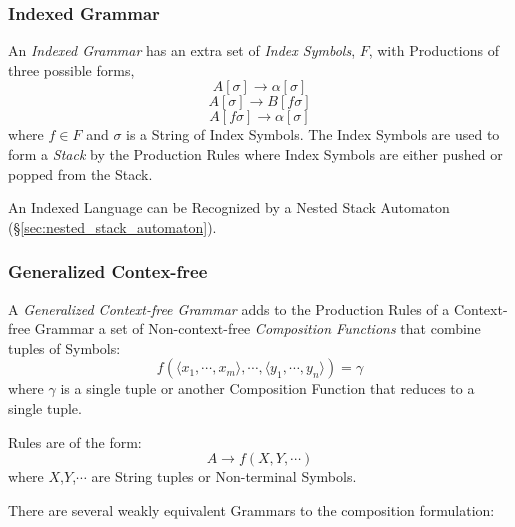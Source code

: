 \subsubsection{Indexed Grammar}\label{subsubsection:indexed_grammar}

An \emph{Indexed Grammar} has an extra set of \emph{Index Symbols},
$F$, with Productions of three possible forms,
\[
  A[\sigma] \rightarrow \alpha[\sigma]
\]\[
  A[\sigma] \rightarrow B[f\sigma]
\]\[
  A[f\sigma] \rightarrow \alpha[\sigma]
\]
where $f \in F$ and $\sigma$ is a String of Index Symbols. The Index
Symbols are used to form a \emph{Stack} by the Production Rules where
Index Symbols are either pushed or popped from the Stack.

An Indexed Language can be Recognized by a Nested Stack Automaton
(\S\ref{sec:nested_stack_automaton}).\cite{aho69}



\subsubsection{Generalized Contex-free}\label{sec:generalized_context_free}

A \emph{Generalized Context-free Grammar} adds to the Production Rules
of a Context-free Grammar a set of Non-context-free \emph{Composition
  Functions} that combine tuples of Symbols:
\[
  f(\langle x_1,\cdots,x_m\rangle,\cdots,\langle
  y_1,\cdots,y_n\rangle)=\gamma
\]
where $\gamma$ is a single tuple or another Composition Function that
reduces to a single tuple.

Rules are of the form:
\[
  A \rightarrow f(X,Y,\cdots)
\]
where $X$,$Y$,$\cdots$ are String tuples or Non-terminal Symbols.

There are several weakly equivalent Grammars to the composition
formulation:

